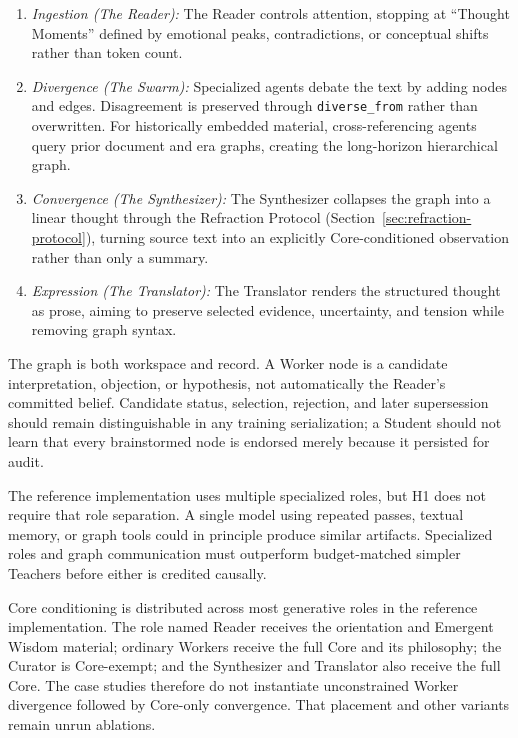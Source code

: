 \begin{enumerate}
    \item \emph{Ingestion (The Reader):} The Reader controls attention,
    stopping at ``Thought Moments'' defined by emotional peaks,
    contradictions, or conceptual shifts rather than token count.

    \item \emph{Divergence (The Swarm):} Specialized agents debate the text by
    adding nodes and edges. Disagreement is preserved through
    \texttt{diverse\_from} rather than overwritten. For historically embedded
    material, cross-referencing agents query prior document and era graphs,
    creating the long-horizon hierarchical graph.

    \item \emph{Convergence (The Synthesizer):} The Synthesizer collapses the
    graph into a linear thought through the Refraction Protocol
    (Section~\ref{sec:refraction-protocol}), turning source text into an
    explicitly Core-conditioned observation rather than only a summary.

    \item \emph{Expression (The Translator):} The Translator renders the
    structured thought as prose, aiming to preserve selected evidence,
    uncertainty, and tension while removing graph syntax.
\end{enumerate}

The graph is both workspace and record. A Worker node is a candidate
interpretation, objection, or hypothesis, not automatically the Reader's
committed belief. Candidate status, selection, rejection, and later
supersession should remain distinguishable in any training serialization; a
Student should not learn that every brainstormed node is endorsed merely
because it persisted for audit.

The reference implementation uses multiple specialized roles, but H1 does not
require that role separation. A single model using repeated passes, textual
memory, or graph tools could in principle produce similar artifacts. Specialized
roles and graph communication must outperform budget-matched simpler Teachers
before either is credited causally.

Core conditioning is distributed across most generative roles in the reference
implementation. The role named Reader receives the orientation and Emergent
Wisdom material; ordinary Workers receive the full Core and its philosophy; the
Curator is Core-exempt; and the Synthesizer and Translator also receive the full
Core. The case studies therefore do not instantiate unconstrained Worker
divergence followed by Core-only convergence. That placement and other variants
remain unrun ablations.

